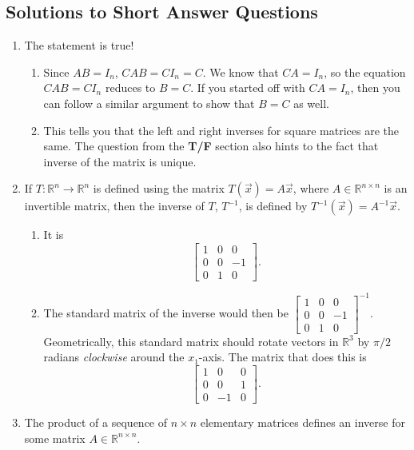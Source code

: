 \subsection{Solutions to Short Answer Questions}
\begin{enumerate}
	\item The statement is true!
		\begin{enumerate}
			\item Since \(AB = I_n\), \(CAB = CI_n = C\). We know that \(CA = I_n\), so the equation \(CAB = CI_n\) reduces to \(B = C\). If you started off
				with \(CA = I_n\), then you can follow a similar argument to show that \(B = C\) as well.
			\item This tells you that the left and right inverses for square matrices are the same. The question from the \textbf{T/F} section also hints to the fact
				that inverse of the matrix is unique.
		\end{enumerate}
	\item If \(T \colon \mathbb{R}^n \to \mathbb{R}^n\) is defined using the matrix \(T(\vec{x}) = A\vec{x}\), where \(A \in \mathbb{R}^{n \times n}\) is an 
		invertible matrix, then the inverse of \(T\), \(T^{-1}\), is defined by \(T^{-1}(\vec{x}) = A^{-1}\vec{x}\).
		\begin{enumerate}
			\item It is \[\begin{bmatrix}1 & 0 & 0\\ 0 & 0 & -1\\ 0 & 1 & 0\end{bmatrix}.\]
			\item The standard matrix of the inverse would then be \(\begin{bmatrix}1 & 0 & 0\\ 0 & 0 & -1\\ 0 & 1 & 0\end{bmatrix}^{-1}\). Geometrically,
				this standard matrix should rotate vectors in \(\mathbb{R}^3\) by \(\pi/2\) radians \emph{clockwise} around the \(x_1\)-axis. The matrix that
				does this is \[\begin{bmatrix}1 & 0 & 0\\ 0 & 0 & 1\\ 0 & -1 & 0\end{bmatrix}.\]
		\end{enumerate}
	\item The product of a sequence of \(n \times n\) elementary matrices defines an inverse for some matrix \(A \in \mathbb{R}^{n \times n}\).

\end{enumerate}
